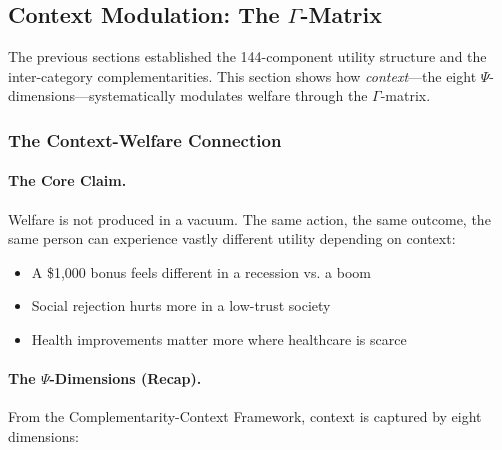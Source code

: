 \subsection{Context Modulation: The $\Gamma$-Matrix}
\label{subsec:context-modulation}


The previous sections established the 144-component utility structure and 
the inter-category complementarities. This section shows how \emph{context}---the 
eight $\Psi$-dimensions---systematically modulates welfare through the $\Gamma$-matrix.

\subsubsection{The Context-Welfare Connection}

\paragraph{The Core Claim.}
Welfare is not produced in a vacuum. The same action, the same outcome, 
the same person can experience vastly different utility depending on context:

\begin{itemize}
\item A \$1,000 bonus feels different in a recession vs. a boom
\item Social rejection hurts more in a low-trust society
\item Health improvements matter more where healthcare is scarce
\end{itemize}

\paragraph{The $\Psi$-Dimensions (Recap).}
From the Complementarity-Context Framework, context is captured by eight dimensions:

